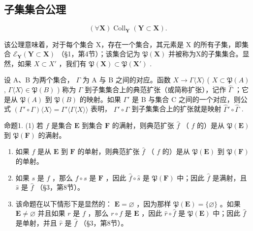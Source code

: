 \subsection{子集集合公理}

\[
(\forall \mathbf {X}) \operatorname{Coll} _ {\mathbf {Y}} (\mathbf {Y} \subset \mathbf {X}).
\]

该公理意味着，对于每个集合 X，存在一个集合，其元素是 X 的所有子集，即集合 \(\mathcal{E}_{\mathbf{Y}}(\mathbf{Y}\subset\mathbf{X})\) （§1，第4节）；该集合记为 \(\mathfrak{P}(\mathbf{X})\) 并被称为X的子集集合。显然，如果 \(X\subset X'\) ，我们有 \(\mathfrak{P}(\mathbf{X})\subset\mathfrak{P}(\mathbf{X}')\) .

设 A、B 为两个集合， \(\Gamma\) 为 A 与 B 之间的对应。函数 \(X \to \Gamma\langle X\rangle\) ( \(X \subset \mathfrak{P}(A)\) , \(\Gamma\langle X\rangle \in \mathfrak{P}(B)\) ) 称为 \(\Gamma\) 到子集集合上的典范扩张（或简称扩张），记作 \(\hat{\Gamma}\) ；它是从 \(\mathfrak{P}(A)\) 到 \(\mathfrak{P}(B)\) 的映射。如果 \(\Gamma'\) 是 B 与集合 C 之间的一个对应，则公式 \((\Gamma' \circ \Gamma)\langle X\rangle = \Gamma'\langle\Gamma\langle X\rangle\rangle\) 表明， \(\Gamma' \circ \Gamma\) 到子集集合上的扩张就是映射 \(\hat{\Gamma}' \circ \hat{\Gamma}\) .

命题1. (1) 若 \(f\) 是集合 \(\mathbf{E}\) 到集合 \(\mathbf{F}\) 的满射，则典范扩张 \(\hat{f}\) （ \(f\) 的）是从 \(\mathfrak{P}(\mathbf{E})\) 到 \(\mathfrak{P}(\mathbf{F})\) 的满射。

\begin{enumerate}
\def\labelenumi{(\arabic{enumi})}
\setcounter{enumi}{1}
\item
  如果 \(f\) 是从 \(\mathbf{E}\) 到 \(\mathbf{F}\) 的单射，则典范扩张 \(\hat{f}\) （ \(f\) 的）是从 \(\mathfrak{P}(\mathbf{E})\) 到 \(\mathfrak{P}(\mathbf{F})\) 的单射。
\item
  如果 \(s\) 是 \(f\) ，那么 \(f \circ s\) 是 \(\mathbf{F}\) ，因此 \(\hat{f} \circ \hat{s}\) 是 \(\mathfrak{P}(\mathbf{F})\) 中；因此 \(\hat{f}\) 是满射，且 \(\hat{s}\) 是 \(\hat{f}\) （§3，第8节）。
\item
  该命题在以下情形下是显然的： \(\mathbf{E} = \varnothing\) ，因为那样 \(\mathfrak{P}(\mathbf{E}) = \{\varnothing\}\) 。如果 \(\mathbf{E} \neq \varnothing\) 并且如果 \(r\) 是 \(f\) ，那么 \(r \circ f\) 是 \(\mathbf{E}\) ，因此 \(\hat{r} \circ \hat{f}\) 是 \(\mathfrak{P}(\mathbf{E})\) 中；因此 \(\hat{f}\) 是单射，并且 \(\hat{r}\) 是 \(\hat{f}\) （§3，第8节）。
\end{enumerate}

